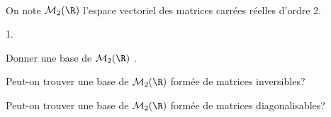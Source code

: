 \documentclass[11pt]{article}%
\begin{document}

\begin{exerciceSP}~\\
  On note $\mathcal{M}_2(\R)$ l'espace vectoriel des matrices carrées
  réelles d'ordre 2.
  \begin{noliste}{1.}
    \setlength{\itemsep}{2mm}
  \item Donner une base de $\mathcal{M}_2(\R)$ .
  \item Peut-on trouver une base de $\mathcal{M}_2(\R)$ formée de
    matrices inversibles?
  \item Peut-on trouver une base de $\mathcal{M}_2(\R)$ formée de
    matrices diagonalisables?
  \end{noliste}
\end{exerciceSP}


\newpage


\end{document}
